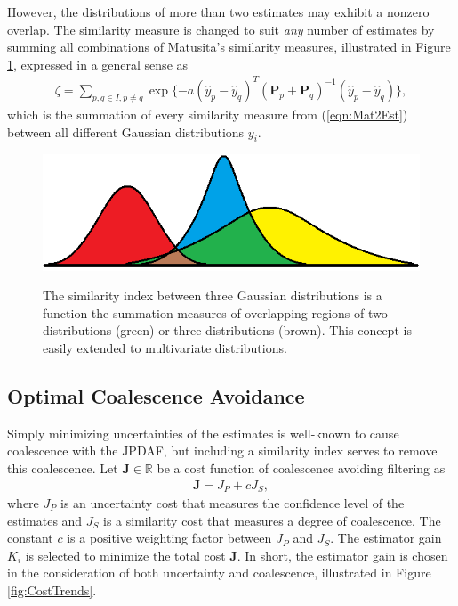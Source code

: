 \documentclass[letterpaper, 10pt, conference]{ieeeconf}
\newcommand{\refeqn}[1]{(\ref{eqn:#1})}
\renewcommand{\Re}{\ensuremath{\mathbb{R}}}
\begin{document}
However, the distributions of more than two estimates may exhibit a nonzero overlap.
The similarity measure is changed to suit \emph{any} number of estimates by summing all combinations of Matusita's similarity measures, illustrated in Figure \ref{fig:SimMeas}, expressed in a general sense as
\begin{align}
\zeta=\sum\limits_{p,q\in I,p\neq q}\exp \{-a(\hat y_{p}- \hat y_{q})^T({\mathbf P}_{p}
+{\mathbf P}_{q})^{-1}(\hat y_{p}-\hat y_{q})\},
\end{align}
which is the summation of every similarity measure from \refeqn{Mat2Est} between all different Gaussian distributions $y_i$.
\begin{figure}
\centerline{
		{\includegraphics[width=\columnwidth]{GaussianDistOverlap1D.png}}
	}
\caption{The similarity index between three Gaussian distributions is a function the summation measures of overlapping regions of two distributions (green) or three distributions (brown). This concept is easily extended to multivariate distributions.
}\label{fig:SimMeas}
\end{figure}

	
\subsection{Optimal Coalescence Avoidance}


Simply minimizing uncertainties of the estimates is well-known to cause coalescence with the JPDAF, but including a similarity index serves to remove this coalescence.
Let $\mathbf{J}\in\Re$ be a cost function of coalescence avoiding filtering as
\begin{align}
\mathbf{J}=J_P+cJ_S,
\end{align}
where $J_P$ is an uncertainty cost that measures the confidence level of the estimates and $J_S$ is a similarity cost that measures a degree of coalescence. The constant $c$ is a positive weighting factor between $J_P$ and $J_S$. 
The estimator gain $K_i$ is selected to minimize the total cost $\mathbf{J}$.
In short, the estimator gain is chosen in the consideration of both uncertainty and coalescence, illustrated in Figure \ref{fig:CostTrends}.
\end{document}
